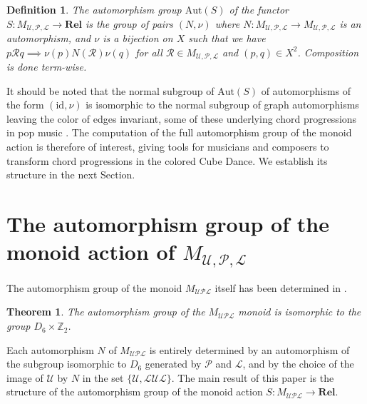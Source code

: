 \documentclass[10pt]{amsart}
\newtheorem{definition}{Definition}
\newtheorem{theorem}{Theorem}
\begin{document}
\begin{definition}
The automorphism group $\text{Aut}(S)$ of the functor $S \colon M_{\mathcal{U},\mathcal{P}, \mathcal{L}} \to \mathbf{Rel}$ is the group of pairs $(N,\nu)$ where $N \colon M_{\mathcal{U},\mathcal{P}, \mathcal{L}} \to M_{\mathcal{U},\mathcal{P}, \mathcal{L}}$ is an automorphism, and $\nu$ is a bijection on $X$ such that we have $p \mathcal{R} q \implies \nu(p) N(\mathcal{R}) \nu(q)$ for all $\mathcal{R} \in M_{\mathcal{U},\mathcal{P}, \mathcal{L}}$ and $(p,q) \in X^2$. Composition is done term-wise.
\end{definition}

It should be noted that the normal subgroup of $\text{Aut}(S)$ of automorphisms of the form $(\text{id},\nu)$ is isomorphic to the normal subgroup of graph automorphisms leaving the color of edges invariant, some of these underlying chord progressions in pop music \cite{Popoff2020,GunnerHamiltonian}. The computation of the full automorphism group of the monoid action is therefore of interest, giving tools for musicians and composers to transform chord progressions in the colored Cube Dance. We establish its structure in the next Section.

\section{The automorphism group of the monoid action of $M_{\mathcal{U},\mathcal{P}, \mathcal{L}}$}

The automorphism group of the monoid $M_{\mathcal{UPL}}$ itself has been determined in \cite{Popoff2018}.

\begin{theorem}
The automorphism group of the $M_{\mathcal{UPL}}$ monoid is isomorphic to the group $D_6 \times \mathbb{Z}_2$.
\end{theorem}

Each automorphism $N$ of $M_{\mathcal{UPL}}$ is entirely determined by an automorphism of the subgroup isomorphic to $D_6$ generated by $\mathcal{P}$ and $\mathcal{L}$, and by the choice of the image of $\mathcal{U}$ by $N$ in the set $\{ \mathcal{U}, \mathcal{L}\mathcal{U}\mathcal{L} \}$. The main result of this paper is the structure of the automorphism group of the monoid action $S \colon M_{\mathcal{UPL}} \to \mathbf{Rel}$.
\end{document}
